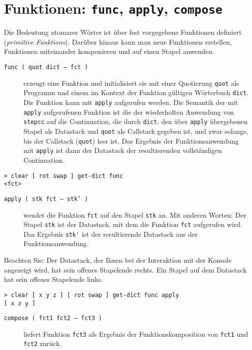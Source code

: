 \section{Funktionen: \texttt{func}, \texttt{apply}, \texttt{compose}}

Die Bedeutung atomarer Wörter ist über fest vorgegebene Funktionen definiert (\emph{primitive Funktions}). Darüber hinaus kann man neue Funktionen erstellen, Funktionen miteinander komponieren und auf einen Stapel anwenden.

\begin{description}
\item[\texttt{func ( quot dict -- fct )}] erzeugt eine Funktion und initialisiert sie mit einer Quotierung \verb|quot| als Programm und einem im Kontext der Funktion gültigen Wörterbuch \verb|dict|. Die Funktion kann mit \verb|apply| aufgerufen werden. Die Semantik der mit \verb|apply| aufgerufenen Funktion ist die der wiederholten Anwendung von \verb|stepcc| auf die Continuation, die durch \verb|dict|, den über \verb|apply| übergebenen Stapel als Datastack und \verb|quot| als Callstack gegeben ist, und zwar solange, bis der Callstack (\verb|quot|) leer ist. Das Ergebnis der Funktionsanwendung mit \verb|apply| ist dann der Datastack der resultierenden vollständigen Continuation. 
\end{description}

\begin{verbatim}
> clear [ rot swap ] get-dict func
<fct>
\end{verbatim}

\begin{description}
\item[\texttt{apply ( stk fct -- stk' )}] wendet die Funktion \verb|fct| auf den Stapel \verb|stk| an. Mit anderen Worten: Der Stapel \verb|stk| ist der Datastack, mit dem die Funktion \verb|fct| aufgerufen wird. Das Ergebnis \verb|stk'| ist der resultierende Datastack aus der Funktionsanwendung.
\end{description}

Beachten Sie: Der Datastack, der Ihnen bei der Interaktion mit der Konsole angezeigt wird, hat sein offenes Stapelende rechts. Ein Stapel auf dem Datastack hat sein offenes Stapelende links.

\begin{verbatim}
> clear [ x y z ] [ rot swap ] get-dict func apply
[ x z y ]
\end{verbatim}

\begin{description}
\item[\texttt{compose ( fct1 fct2 -- fct3 )}] liefert Funktion \verb|fct3| als Ergebnis der Funktionskomposition von \verb|fct1| und \verb|fct2| zurück.
\end{description}

